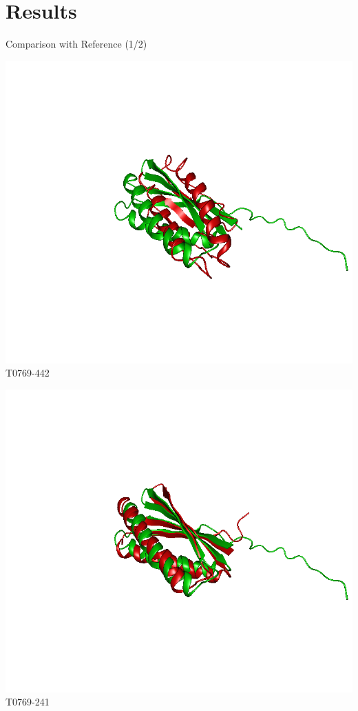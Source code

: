 \section{Results}


\begin{frame}{Comparison with Reference (1/2)}
    \begin{center}
        \begin{minipage}{.45\textwidth}
            \includegraphics[width=\textwidth]{../report/figures/T0769TS442}\\
            {T0769-442}
        \end{minipage}
        \begin{minipage}{.45\textwidth}
            \includegraphics[width=\textwidth]{../report/figures/T0769TS241}\\
            {T0769-241}
        \end{minipage}
    \end{center}
\end{frame}
